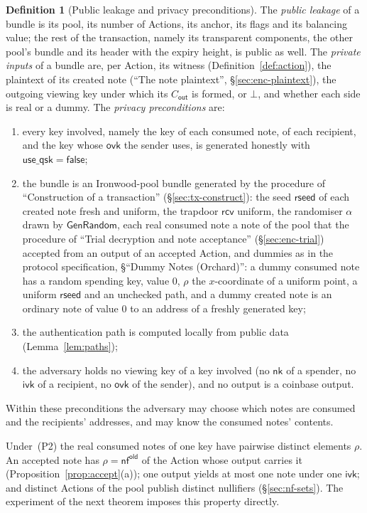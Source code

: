 \documentclass[11pt,a4paper]{article}
\theoremstyle{definition}
\newtheorem{definition}[theorem]{Definition}
\newcommand{\nfsym}{\mathsf{nf}}
\newcommand{\nksym}{\ensuremath{\mathsf{nk}}}
\newcommand{\ivk}{\ensuremath{\mathsf{ivk}}}
\newcommand{\ovk}{\ensuremath{\mathsf{ovk}}}
\newcommand{\rcv}{\ensuremath{\mathsf{rcv}}}
\begin{document}
\begin{definition}[Public leakage and privacy preconditions]
The \emph{public leakage} of a bundle is its pool, its number of Actions,
its anchor, its flags and its balancing value; the rest of the transaction,
namely its transparent components, the other pool's bundle and its header
with the expiry height, is public as well. The \emph{private inputs} of a
bundle are, per Action, its witness (Definition~\ref{def:action}), the
plaintext of its created note (``The note plaintext'',
\S\ref{sec:enc-plaintext}), the outgoing viewing key under which its
$C_{\mathsf{out}}$ is formed, or $\bot$, and whether each side is real or a
dummy. The \emph{privacy preconditions} are:
\begin{enumerate}
\item[(P1)] every key involved, namely the key of each consumed note, of
  each recipient, and the key whose $\ovk$ the sender uses, is generated
  honestly with $\mathsf{use\_qsk} = \mathsf{false}$;
\item[(P2)] the bundle is an Ironwood-pool bundle generated by the procedure
  of ``Construction of a transaction'' (\S\ref{sec:tx-construct}): the seed
  $\mathsf{rseed}$ of each created note fresh and uniform, the trapdoor
  $\rcv$ uniform, the randomiser $\alpha$ drawn by $\mathsf{GenRandom}$,
  each real consumed note a note of the pool that the procedure of ``Trial
  decryption and note acceptance'' (\S\ref{sec:enc-trial}) accepted from an
  output of an accepted Action, and dummies as in the protocol
  specification, \S``Dummy Notes (Orchard)'': a dummy consumed note has a
  random spending key, value $0$, $\rho$ the $x$-coordinate of a uniform
  point, a uniform $\mathsf{rseed}$ and an unchecked path, and a dummy
  created note is an ordinary note of value $0$ to an address of a freshly
  generated key;
\item[(P3)] the authentication path is computed locally from public data
  (Lemma~\ref{lem:paths});
\item[(P4)] the adversary holds no viewing key of a key involved (no
  $\nksym$ of a spender, no $\ivk$ of a recipient, no $\ovk$ of the
  sender), and no output is a coinbase output.
\end{enumerate}
Within these preconditions the adversary may choose which notes are consumed
and the recipients' addresses, and may know the consumed notes' contents.
\end{definition}

Under~(P2) the real consumed notes of one key have pairwise distinct
elements $\rho$. An accepted note has $\rho = \nfsym^{\mathsf{old}}$ of the
Action whose output carries it (Proposition~\ref{prop:accept}(a)); one
output yields at most one note under one $\ivk$; and distinct Actions of the
pool publish distinct nullifiers (\S\ref{sec:nf-sets}). The experiment of
the next theorem imposes this property directly.
\end{document}
